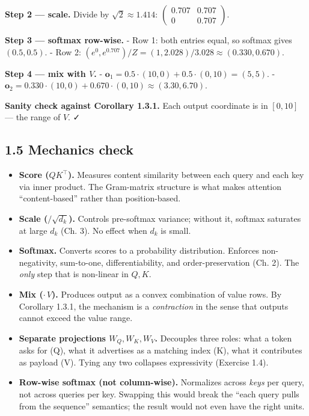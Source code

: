 \documentclass[
]{article}
\providecommand{\tightlist}{%
  \setlength{\itemsep}{0pt}\setlength{\parskip}{0pt}}
\begin{document}
\textbf{Step 2 --- scale.} Divide by \(\sqrt{2} \approx 1.414\):
\(\begin{pmatrix} 0.707 & 0.707 \\ 0 & 0.707 \end{pmatrix}\).

\textbf{Step 3 --- softmax row-wise.} - Row 1: both entries equal, so
softmax gives \((0.5, 0.5)\). - Row 2:
\((e^0, e^{0.707}) / Z = (1, 2.028) / 3.028 \approx (0.330, 0.670)\).

\textbf{Step 4 --- mix with \(V\).} -
\(\mathbf{o}_1 = 0.5 \cdot (10, 0) + 0.5 \cdot (0, 10) = (5, 5)\). -
\(\mathbf{o}_2 = 0.330 \cdot (10, 0) + 0.670 \cdot (0, 10) \approx (3.30, 6.70)\).

\textbf{Sanity check against Corollary 1.3.1.} Each output coordinate is
in \([0, 10]\) --- the range of \(V\). ✓

\hypertarget{mechanics-check}{%
\subsection{1.5 Mechanics check}\label{mechanics-check}}

\begin{itemize}
\tightlist
\item
  \textbf{Score (\(QK^\top\)).} Measures content similarity between each
  query and each key via inner product. The Gram-matrix structure is
  what makes attention ``content-based'' rather than position-based.
\item
  \textbf{Scale (\(/\sqrt{d_k}\)).} Controls pre-softmax variance;
  without it, softmax saturates at large \(d_k\) (Ch. 3). No effect when
  \(d_k\) is small.
\item
  \textbf{Softmax.} Converts scores to a probability distribution.
  Enforces non-negativity, sum-to-one, differentiability, and
  order-preservation (Ch. 2). The \emph{only} step that is non-linear in
  \(Q, K\).
\item
  \textbf{Mix (\(\cdot\, V\)).} Produces output as a convex combination
  of value rows. By Corollary 1.3.1, the mechanism is a
  \emph{contraction} in the sense that outputs cannot exceed the value
  range.
\item
  \textbf{Separate projections \(W_Q, W_K, W_V\).} Decouples three
  roles: what a token asks for (Q), what it advertises as a matching
  index (K), what it contributes as payload (V). Tying any two collapses
  expressivity (Exercise 1.4).
\item
  \textbf{Row-wise softmax (not column-wise).} Normalizes across
  \emph{keys} per query, not across queries per key. Swapping this would
  break the ``each query pulls from the sequence'' semantics; the result
  would not even have the right units.
\end{itemize}
\end{document}

